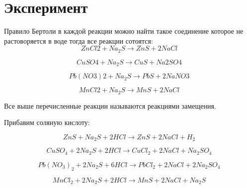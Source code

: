 \section{Эксперимент}

\tab Правило Бертоли в каждой реакции можно 
найти такое соединение которое не растоворяется 
в воде тогда все реакции сотоятся:
\begin{equation} 
 ZnCl2 + Na_2S \to  ZnS + 2NaCl 
\end{equation} 

\begin{equation} 
 CuSO4 + Na_2S \to  CuS + Na2SO4 
\end{equation} 

\begin{equation} 
 Pb(NO3)2 + Na_2S \to  PbS + 2NaNO3 
\end{equation} 

\begin{equation} 
 MnCl2 + Na_2S \to  MnS + 2NaCl 
\end{equation} 

Все выше перечисленные реакции называются реакциями
замещения. 

Прибавим соляную кислоту:

\begin{equation} 
ZnS + Na_2S + 2HCl \to  ZnS + 2NaCl + H_2
\end{equation} 

\begin{equation}
CuSO_4 + 2Na_2S + 2HCl \to  CuCl_2 + 2NaCl + Na_2SO_4
\end{equation}

\begin{equation}
Pb(NO_3)_2 + 2Na_2S + 6HCl \to  PbCl_2 + 2NaCl + 2Na_2SO_4
\end{equation}

\begin{equation}
MnCl_2 + 2Na_2S + 2HCl \to MnS + 2NaCl + Na_2S
\end{equation}


